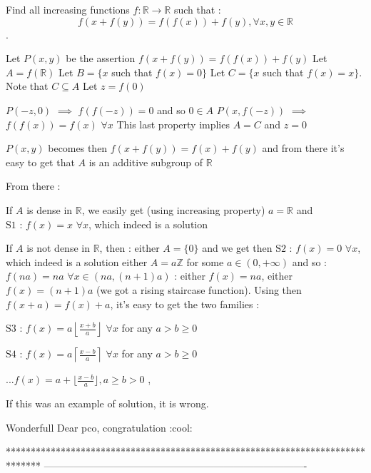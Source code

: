 \begin{solution}
	\begin{tcolorbox}Find all increasing functions $f: \mathbb{R} \to \mathbb{R}$ such that : 
\[ f(x+f(y))=f(f(x))+f(y)  , \forall x,y \in \mathbb{R} \] .\end{tcolorbox}
Let $P(x,y)$ be the assertion $f(x+f(y))=f(f(x))+f(y)$
Let $A=f(\mathbb R)$
Let $B=\{x$ such that $f(x)=0\}$
Let $C=\{x$ such that $f(x)=x\}$. Note that $C\subseteq A$
Let $z=f(0)$

$P(-z,0)$ $\implies$ $f(f(-z))=0$ and so $0\in A$
$P(x,f(-z))$ $\implies$ $f(f(x))=f(x)$ $\forall x$ 
This last property implies $A=C$ and $z=0$

$P(x,y)$ becomes then $f(x+f(y))=f(x)+f(y)$ and from there it's easy to get that $A$ is an additive subgroup of $\mathbb R$

From there :

If $A$ is dense in $\mathbb R$, we easily get (using increasing property) $a=\mathbb R$ and $\boxed{\text{S1 : }f(x)=x}$ $\forall x$, which indeed is a solution

If $A$ is not dense in $\mathbb R$, then :
either $A=\{0\}$ and we get then $\boxed{\text{S2 : }f(x)=0}$ $\forall x$, which indeed is a solution
either $A=a\mathbb Z$ for some $a\in(0,+\infty)$ and so :
$f(na)=na$
$\forall x\in(na,(n+1)a)$ : either $f(x)=na$, either $f(x)=(n+1)a$ (we got a rising staircase function).
Using then $f(x+a)=f(x)+a$, it's easy to get the two families :

$\boxed{\text{S3 : }f(x)=a\left\lfloor\frac{x+b}a\right\rfloor}$ $\forall x$ for any $a>b\ge 0$

$\boxed{\text{S4 : }f(x)=a\left\lceil\frac{x-b}a\right\rceil}$ $\forall x$ for any $a>b\ge 0$


\begin{tcolorbox}...${f(x)=a+\lfloor{\frac{x-b}{a}}\rfloor} , a\geq b>0 $ ,\end{tcolorbox}
If this was an example of solution, it is wrong.
\end{solution}



\begin{solution}
	Wonderfull Dear pco, congratulation   :cool:
\end{solution}
*******************************************************************************
-------------------------------------------------------------------------------

